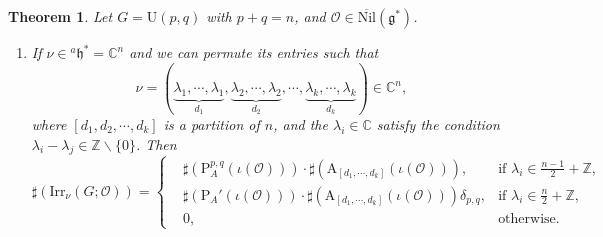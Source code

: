 \documentclass[12pt, a4paper]{amsart}
\numberwithin{equation}{section}
\newtheorem{thm}{Theorem}[section]
\newcommand{\BC}{{\mathbb {C}}}
\newcommand{\BZ}{{\mathbb {Z}}}
\newcommand{\CO}{{\mathcal {O}}}
\newcommand{\fg}{\mathfrak{g}}
\newcommand{\fh}{\mathfrak{h}}
\newcommand{\U}{{\mathrm{U}}}
\newcommand{\Irr}{{\mathrm{Irr}}}
\newcommand{\Nil}{{\mathrm{Nil}}}
\renewcommand{\bar}{\overline}
\begin{document}
\begin{thm}\label{U}
    Let $G = \U(p,q)$ with $p + q = n$, and $\CO \in \bar{\Nil}(\fg^*)$.
    \begin{enumerate}
        \item If $\nu \in {^a\fh^*} = \BC^n$ and we can permute its entries such that 
        \[ 
        \nu =  (\underbrace{\lambda_1, \cdots, \lambda_1}_{d_1}, \underbrace{\lambda_2, \cdots, \lambda_2}_{d_2}, \cdots, \underbrace{\lambda_k, \cdots, \lambda_k}_{d_k} ) \in \BC^n, 
        \]
        where $[d_1, d_2, \cdots, d_k]$ is a partition of $n$, and the $\lambda_i \in \BC$ satisfy the condition $\lambda_i - \lambda_j \in \BZ \backslash \{0\}$. Then
        \begin{equation}
            \sharp(\Irr_{\nu}(G;\CO)) = \left\{
            \begin{aligned}
                &\sharp(\mathrm{P}_{A}^{p,q}(\iota(\CO))) \cdot \sharp(\mathrm{A}_{[d_1,\cdots,d_{k}]}(\iota(\CO))), & \textrm{if $\lambda_i \in \frac{n-1}{2} + \BZ$}, \\ 
                &\sharp(\mathrm{P}_{A}'(\iota(\CO)))\cdot\sharp(\mathrm{A}_{[d_1,\cdots,d_k]}(\iota(\CO)))\delta_{p,q}, & \textrm{if $\lambda_i \in \frac{n}{2} + \BZ$},\\
                &0, & \textrm{otherwise}.
            \end{aligned}
            \right.
        \end{equation}


\end{enumerate}
\end{thm}
\end{document}
